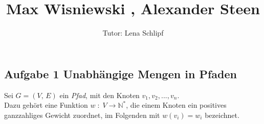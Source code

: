 \documentclass[11pt,a4paper,ngerman]{article}
\author{Tutor: Lena Schlipf}
\date{}
\title{Max Wisniewski , Alexander Steen}
\begin{document}

\maketitle
\thispagestyle{fancy}

\subsection*{Aufgabe 1 \mdseries Unabhängige Mengen in Pfaden}

Sei $G = \left( V ,\, E \right) $ ein \emph{Pfad}, mit den Knoten $v_1, v_2, ..., v_n$.\\
Dazu gehört eine Funktion $w \; : \; V \longrightarrow \mathbb{N}^*$, die einem Knoten ein positives ganzzahliges Gewicht zuordnet, im Folgenden mit $w(v_i) = w_i$ bezeichnet.
\\
\end{document}
